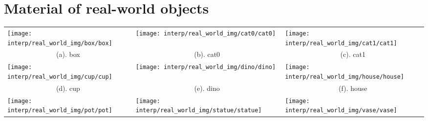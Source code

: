 \section{Material of real-world objects}
\label{sec:real_world_dataset}
\begin{table}[!hbtp]
  \centering
  \begin{tabular}{*{9}{c}}
  \multicolumn{3}{l}{\texttt{[image: interp/real\_world\_img/box/box]}} &
  \multicolumn{3}{l}{\texttt{[image: interp/real\_world\_img/cat0/cat0]}} &
  \multicolumn{3}{l}{\texttt{[image: interp/real\_world\_img/cat1/cat1]}}\\
  \multicolumn{3}{c}{(a). box} & \multicolumn{3}{c}{(b). cat0} & \multicolumn{3}{c}{(c). cat1} \\
  \multicolumn{3}{l}{\texttt{[image: interp/real\_world\_img/cup/cup]}} &
  \multicolumn{3}{l}{\texttt{[image: interp/real\_world\_img/dino/dino]}} &
  \multicolumn{3}{l}{\texttt{[image: interp/real\_world\_img/house/house]}}\\
  \multicolumn{3}{c}{(d). cup} & \multicolumn{3}{c}{(e). dino} & \multicolumn{3}{c}{(f). house} \\
  \multicolumn{3}{l}{\texttt{[image: interp/real\_world\_img/pot/pot]}} &
  \multicolumn{3}{l}{\texttt{[image: interp/real\_world\_img/statue/statue]}} &
  \multicolumn{3}{l}{\texttt{[image: interp/real\_world\_img/vase/vase]}}\\

\end{tabular}
\end{table}
